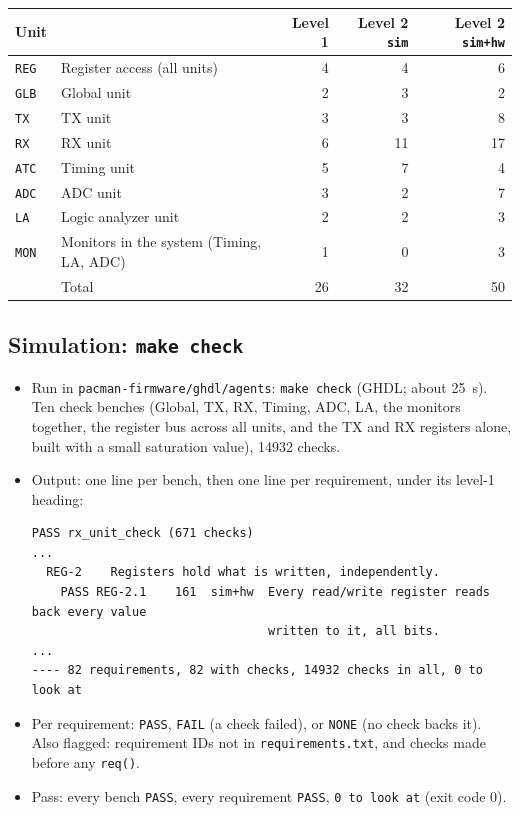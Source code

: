 \documentclass[11pt]{article}
\begin{document}
\begin{center}
\begin{tabular}{@{}llrrr@{}}
\toprule
Unit & & Level 1 & Level 2 \texttt{sim} & Level 2 \texttt{sim+hw} \\
\midrule
\texttt{REG} & Register access (all units) & 4 & 4 & 6 \\
\texttt{GLB} & Global unit & 2 & 3 & 2 \\
\texttt{TX} & TX unit & 3 & 3 & 8 \\
\texttt{RX} & RX unit & 6 & 11 & 17 \\
\texttt{ATC} & Timing unit & 5 & 7 & 4 \\
\texttt{ADC} & ADC unit & 3 & 2 & 7 \\
\texttt{LA} & Logic analyzer unit & 2 & 2 & 3 \\
\texttt{MON} & Monitors in the system (Timing, LA, ADC) & 1 & 0 & 3 \\
\midrule
 & Total & 26 & 32 & 50 \\
\bottomrule
\end{tabular}
\end{center}

\subsection{Simulation: \texttt{make check}}

\begin{itemize}
\item Run in \texttt{pacman-firmware/ghdl/agents}: \texttt{make check} (GHDL; about 25~s).  Ten check benches
  (Global, TX, RX, Timing, ADC, LA, the monitors together, the register bus across all units, and the TX and RX
  registers alone, built with a small saturation value), 14932 checks.
\item Output: one line per bench, then one line per requirement, under its level-1 heading:
\begin{verbatim}
PASS rx_unit_check (671 checks)
...
  REG-2    Registers hold what is written, independently.
    PASS REG-2.1    161  sim+hw  Every read/write register reads back every value
                                 written to it, all bits.
...
---- 82 requirements, 82 with checks, 14932 checks in all, 0 to look at
\end{verbatim}
\item Per requirement: \texttt{PASS}, \texttt{FAIL} (a check failed), or \texttt{NONE} (no check backs it).  Also
  flagged: requirement IDs not in \texttt{requirements.txt}, and checks made before any \texttt{req()}.
\item Pass: every bench \texttt{PASS}, every requirement \texttt{PASS}, \texttt{0 to look at} (exit code 0).
\end{itemize}
\end{document}
